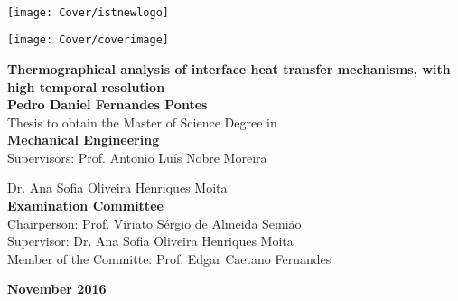 \setcounter{page}{1} 


\thispagestyle{empty}
\begin{flushleft} ~\\ \vspace{-12mm} \hspace{-12mm}  \texttt{[image: Cover/istnewlogo]} 
\vspace{10mm}
\\ \begin{center} \texttt{[image: Cover/coverimage]}  \end{center} %
 \vspace{5mm}
\centering
\LARGE \textbf{Thermographical analysis of interface heat transfer mechanisms, with high temporal resolution}
\\ \vspace{15mm}
\Large \textbf{Pedro Daniel Fernandes Pontes} \\
\vspace{12mm}
\large Thesis to obtain the Master of Science Degree in
\\ \vspace{2mm}
\LARGE \textbf{Mechanical Engineering}
\\ \vspace{10mm}
\large Supervisors: Prof. Antonio Luís Nobre Moreira

Dr. Ana Sofia Oliveira Henriques Moita
\\ \vspace{15mm}
\Large \textbf{Examination Committee}
\\ \vspace{5mm}
\large Chairperson:	Prof. Viriato Sérgio de Almeida Semião \\
\large Supervisor: Dr. Ana Sofia Oliveira Henriques Moita \\
\large Member of the Committe: Prof. Edgar Caetano Fernandes \\
 
\vspace{15mm}

\Large \textbf{November 2016} \\
\let\thepage\relax
\end{flushleft}
\pagebreak


